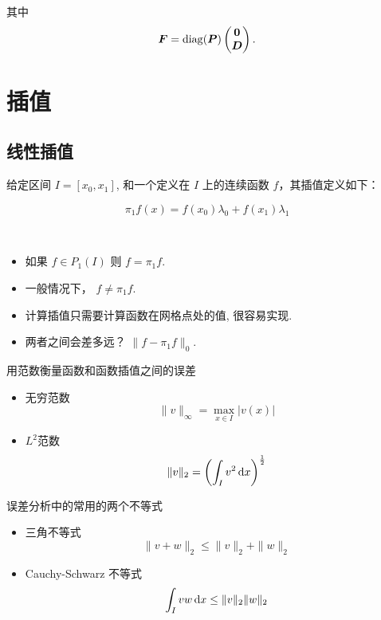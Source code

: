 \documentclass{article}
\begin{document}
其中
\begin{equation}\label{eq:F}
    {\boldsymbol F} = \mathrm{diag}({\boldsymbol P})
\begin{pmatrix} 
    \mathbf 0\\ {\boldsymbol D}
\end{pmatrix}.
\end{equation}

\section{插值}
\subsection{线性插值}
给定区间 $I = [x_0, x_1]$, 和一个定义在 $I$ 上的连续函数 $f$，其插值定义如下： 

$$
\pi_1f(x) = f(x_0)\lambda_0 + f(x_1)\lambda_1
$$

\begin{framed}
\begin{remark}
~\\
\begin{itemize}
    \item 如果 $f \in P_1(I)$ 则 $ f = \pi_1 f$. 
    \item 一般情况下， $f \not= \pi_1 f$. 
    \item 计算插值只需要计算函数在网格点处的值, 很容易实现.
    \item 两者之间会差多远？ $\| f - \pi_1 f \|_0$.
\end{itemize}
\end{remark}
\end{framed}

\begin{framed}
\begin{remark}
用范数衡量函数和函数插值之间的误差
\begin{itemize}
    \item 无穷范数 $$ \|v\|_\infty = \max_{x\in I} |v(x)|$$
    \item $L^2$范数 $$ \|v\|_2 = \left(\int_I v^2 \,\mathrm d x\right)^{\frac{1}{2}}$$
\end{itemize}
\end{remark}
\end{framed}

\begin{framed}
\begin{remark}
误差分析中的常用的两个不等式
\begin{itemize}
    \item 三角不等式 $$ \|v + w\|_2 \leq \|v\|_2 + \|w\|_2 $$
\item Cauchy-Schwarz 不等式 $$\int_I vw \,\mathrm d x \leq \|v\|_2  \|w\|_2 $$
\end{itemize}
\end{remark}
\end{framed}
\end{document}
